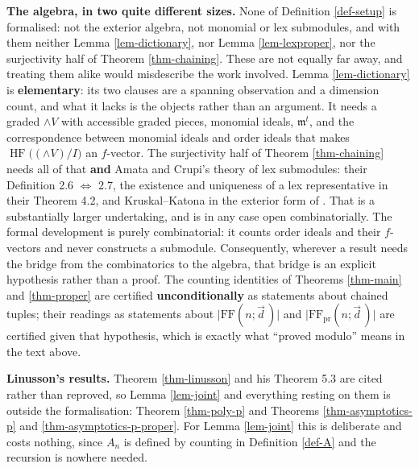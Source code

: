 \documentclass[11pt, a4paper, abstract=yes]{scrartcl}
\theoremstyle{definition}
\theoremstyle{remark}
\theoremstyle{plain}
\newcommand{\HF}{\operatorname{HF}}
\newcommand{\Ext}{\mathord{\wedge }V}
\begin{document}
\begin{itemize}
\textbf{The algebra, in two quite different sizes.} None of Definition \ref{def-setup} is formalised: not
the exterior algebra, not monomial or lex submodules, and with them neither Lemma
\ref{lem-dictionary}, nor Lemma \ref{lem-lexproper}, nor the surjectivity half of Theorem
\ref{thm-chaining}. These are not equally far away, and treating them alike would misdescribe the
work involved. Lemma \ref{lem-dictionary} is \textbf{elementary}: its two clauses are a spanning
observation and a dimension count, and what it lacks is the objects rather than an argument. It
needs a graded \(\Ext\) with accessible graded pieces, monomial ideals, \(\mathfrak m^t\), and the
correspondence between monomial ideals and order ideals that makes \(\HF\bigl((\Ext)/I\bigr)\) an
\(f\)-vector. The surjectivity half of Theorem \ref{thm-chaining} needs all of that \textbf{and} Amata
and Crupi's theory of lex submodules: their Definition 2.6 \(\Leftrightarrow\) 2.7, the
existence and uniqueness of a lex representative in their Theorem 4.2, and Kruskal--Katona in
the exterior form of \textcite{AramovaHerzogHibi1997}. That is a substantially larger
undertaking, and is in any case open combinatorially. The formal development is
purely combinatorial: it counts order ideals and their \(f\)-vectors and never constructs a
submodule. Consequently, wherever a result needs the bridge from the combinatorics to the algebra,
that bridge is an explicit hypothesis rather than a proof. The counting identities of Theorems
\ref{thm-main} and \ref{thm-proper} are certified \textbf{unconditionally} as statements about chained tuples;
their readings as statements about \(\lvert\mathrm{FF}(n;\vec d\,)\rvert\) and
\(\lvert\mathrm{FF}_{\mathrm{pr}}(n;\vec d\,)\rvert\) are certified given that hypothesis, which
is exactly what ``proved modulo'' means in the text above.

\textbf{Linusson's results.} Theorem \ref{thm-linusson} and his Theorem 5.3 are cited rather than reproved,
so Lemma \ref{lem-joint} and everything resting on them is outside the formalisation: Theorem
\ref{thm-poly-p} and Theorems \ref{thm-asymptotics-p} and \ref{thm-asymptotics-p-proper}. For Lemma
\ref{lem-joint} this is deliberate and costs nothing, since \(A_n\) is defined by counting in
Definition \ref{def-A} and the recursion is nowhere needed.


\end{itemize}
\end{document}
